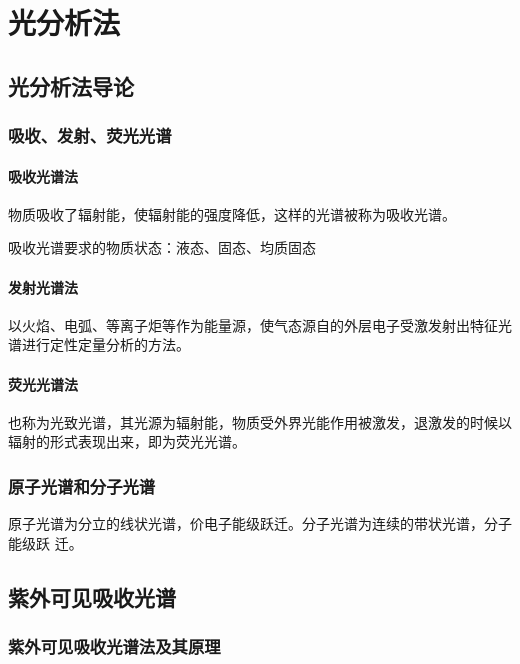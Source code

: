 \chapter{光分析法}

\section{光分析法导论}

\subsection{吸收、发射、荧光光谱}

\subsubsection{吸收光谱法}

物质吸收了辐射能，使辐射能的强度降低，这样的光谱被称为吸收光谱。

吸收光谱要求的物质状态：液态、固态、均质固态

\subsubsection{发射光谱法}

以火焰、电弧、等离子炬等作为能量源，使气态源自的外层电子受激发射出特征光谱进行定性定量分析的方法。

\subsubsection{荧光光谱法}

也称为光致光谱，其光源为辐射能，物质受外界光能作用被激发，退激发的时候以辐射的形式表现出来，即为荧光光谱。


\subsection{原子光谱和分子光谱}

原子光谱为分立的线状光谱，价电子能级跃迁。分子光谱为连续的带状光谱，分子能级跃
迁。

\section{紫外可见吸收光谱}

\subsection{紫外可见吸收光谱法及其原理}

